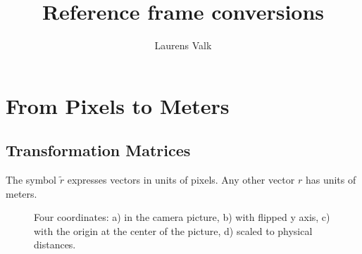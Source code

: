 \documentclass[12pt, a4paper]
{article}
\title{Reference frame conversions}
\author{Laurens Valk}
\providecommand{\tr}{\tilde{r}}
\begin{document}
\maketitle

\tableofcontents

\section{From Pixels to Meters} 
\subsection{Transformation Matrices}
The symbol $\tr$ expresses vectors in units of pixels. Any other vector $r$ has units of meters.
\begin{figure}[H]
\centering

\caption{Four coordinates: a) in the camera picture, b) with flipped y axis, c) with the origin at the center of the picture, d) scaled to physical distances.
\label{fig:robotframe}}
\end{figure}
\end{document}
